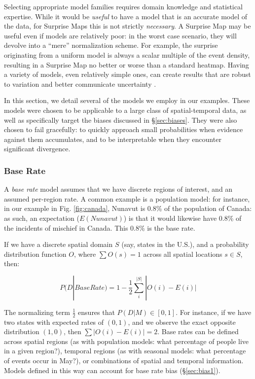 \documentclass[journal]{vgtc}                %
\begin{document}
Selecting appropriate model families requires domain knowledge and statistical expertise. While it would be \emph{useful} to have a model that is an accurate model of the data, for Surprise Maps this is not strictly \emph{necessary}. A Surprise Map may be useful even if models are relatively poor: in the worst case scenario, they will devolve into a ``mere'' normalization scheme. For example, the surprise originating from a uniform model is always a scalar multiple of the event density, resulting in a Surprise Map no better or worse than a standard heatmap. Having a variety of models, even relatively simple ones, can create results that are robust to variation and better communicate uncertainty \cite{hoeting1999bayesian}.

In this section, we detail several of the models we employ in our examples. These models were chosen to be applicable to a large class of spatial-temporal data, as well as specifically target the biases discussed in \S\ref{sec:biases}. They were also chosen to fail gracefully: to quickly approach small probabilities when evidence against them accumulates, and to be interpretable when they encounter significant divergence.

\subsubsection{Base Rate}

A \emph{base rate} model assumes that we have discrete regions of interest, and an assumed per-region rate. A common example is a population model: for instance, in our example in Fig. \ref{fig:canada}, Nunavut is 0.8\% of the population of Canada: as such, an expectation ($E(Nunavut)$) is that it would likewise have 0.8\% of the incidents of mischief in Canada. This 0.8\% is the base rate.

If we have a discrete spatial domain $S$ (say, states in the U.S.), and a probability distribution function $O$, where $\sum O(s)=1$ across all spatial locations $s\in S$, then:

$$P(D|Base Rate) = 1 - \frac{1}{2}\sum_{i}^{|S|} | O(i) - E(i) | $$

The normalizing term $\frac{1}{2}$ ensures that $P(D|M) \in [0,1]$. For instance, if we have two states with expected rates of $(0,1)$, and we observe the exact opposite distribution $(1,0)$, then $\sum |O(i)-E(i)| = 2$. Base rates can be defined across spatial regions (as with population models: what percentage of people live in a given region?), temporal regions (as with seasonal models: what percentage of events occur in May?), or combinations of spatial and temporal information. Models defined in this way can account for base rate bias (\S\ref{sec:bias1}).
\end{document}
